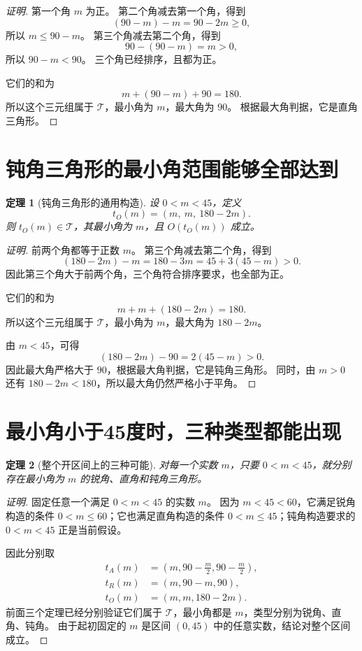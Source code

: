 \documentclass[UTF8,a4paper,zihao=-4,oneside,openany,fontset=fandol]{ctexbook}
\newtheorem{theorem}{定理}[chapter]
\theoremstyle{definition}
\theoremstyle{remark}
\begin{document}
\begin{proof}[证明]
第一个角 $m$ 为正。
第二个角减去第一个角，得到
\[
(90-m)-m=90-2m\ge0,
\]
所以 $m\le90-m$。
第三个角减去第二个角，得到
\[
90-(90-m)=m>0,
\]
所以 $90-m<90$。
三个角已经排序，且都为正。

它们的和为
\[
m+(90-m)+90=180.
\]
所以这个三元组属于 $\mathcal T$，最小角为 $m$，最大角为 $90$。
根据最大角判据，它是直角三角形。
\end{proof}

\section{钝角三角形的最小角范围能够全部达到}

\begin{theorem}[钝角三角形的通用构造]
设 $0<m<45$，定义
\[
t_O(m)=(m,\ m,\ 180-2m).
\]
则 $t_O(m)\in\mathcal T$，其最小角为 $m$，且 $O(t_O(m))$ 成立。
\end{theorem}

\begin{proof}[证明]
前两个角都等于正数 $m$。
第三个角减去第二个角，得到
\[
(180-2m)-m
=180-3m
=45+3(45-m)>0.
\]
因此第三个角大于前两个角，三个角符合排序要求，也全部为正。

它们的和为
\[
m+m+(180-2m)=180.
\]
所以这个三元组属于 $\mathcal T$，最小角为 $m$，最大角为 $180-2m$。

由 $m<45$，可得
\[
(180-2m)-90=2(45-m)>0.
\]
因此最大角严格大于 $90$，根据最大角判据，它是钝角三角形。
同时，由 $m>0$ 还有 $180-2m<180$，所以最大角仍然严格小于平角。
\end{proof}

\section{最小角小于45度时，三种类型都能出现}

\begin{theorem}[整个开区间上的三种可能]
对每一个实数 $m$，只要 $0<m<45$，就分别存在最小角为 $m$ 的锐角、直角和钝角三角形。
\end{theorem}

\begin{proof}[证明]
固定任意一个满足 $0<m<45$ 的实数 $m$。
因为 $m<45<60$，它满足锐角构造的条件 $0<m\le60$；它也满足直角构造的条件 $0<m\le45$；钝角构造要求的 $0<m<45$ 正是当前假设。

因此分别取
\[
\begin{aligned}
t_A(m)&=\left(m,90-\frac m2,90-\frac m2\right),\\
t_R(m)&=(m,90-m,90),\\
t_O(m)&=(m,m,180-2m).
\end{aligned}
\]
前面三个定理已经分别验证它们属于 $\mathcal T$，最小角都是 $m$，类型分别为锐角、直角、钝角。
由于起初固定的 $m$ 是区间 $(0,45)$ 中的任意实数，结论对整个区间成立。
\end{proof}
\end{document}
